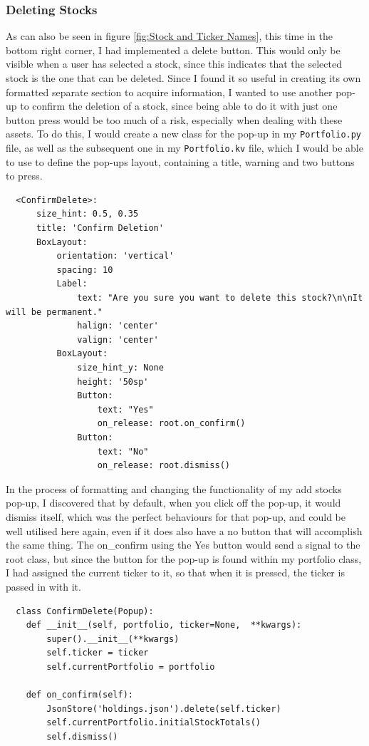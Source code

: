 \documentclass{article}
\begin{document}
\subsubsection{Deleting Stocks}
As can also be seen in figure \ref{fig:Stock and Ticker Names}, this time in the bottom right corner, I had implemented a delete button. This would only be visible when a user has selected a stock, since this indicates that the selected stock is the one that can be deleted. Since I found it so useful in creating its own formatted separate section to acquire information, I wanted to use another pop-up to confirm the deletion of a stock, since being able to do it with just one button press would be too much of a risk, especially when dealing with these assets. To do this, I would create a new class for the pop-up in my \texttt{Portfolio.py} file, as well as the subsequent one in my \texttt{Portfolio.kv} file, which I would be able to use to define the pop-ups layout, containing a title, warning and two buttons to press.\\\vspace{0.3cm}

\begin{verbatim}
  <ConfirmDelete>:
      size_hint: 0.5, 0.35
      title: 'Confirm Deletion'
      BoxLayout:
          orientation: 'vertical'
          spacing: 10
          Label:
              text: "Are you sure you want to delete this stock?\n\nIt will be permanent."
              halign: 'center'
              valign: 'center'
          BoxLayout:
              size_hint_y: None
              height: '50sp'
              Button:
                  text: "Yes"
                  on_release: root.on_confirm()
              Button:
                  text: "No"
                  on_release: root.dismiss()
\end{verbatim}

\vspace{0.3cm}
In the process of formatting and changing the functionality of my add stocks pop-up, I discovered that by default, when you click off the pop-up, it would dismiss itself, which was the perfect behaviours for that pop-up, and could be well utilised here again, even if it does also have a no button that will accomplish the same thing. The on\_confirm using the Yes button would send a signal to the root class, but since the button for the pop-up is found within my portfolio class, I had assigned the current ticker to it, so that when it is pressed, the ticker is passed in with it.

\begin{verbatim}
  class ConfirmDelete(Popup):
    def __init__(self, portfolio, ticker=None,  **kwargs):
        super().__init__(**kwargs)
        self.ticker = ticker
        self.currentPortfolio = portfolio

    def on_confirm(self):
        JsonStore('holdings.json').delete(self.ticker)
        self.currentPortfolio.initialStockTotals()
        self.dismiss()
\end{verbatim}
\end{document}
